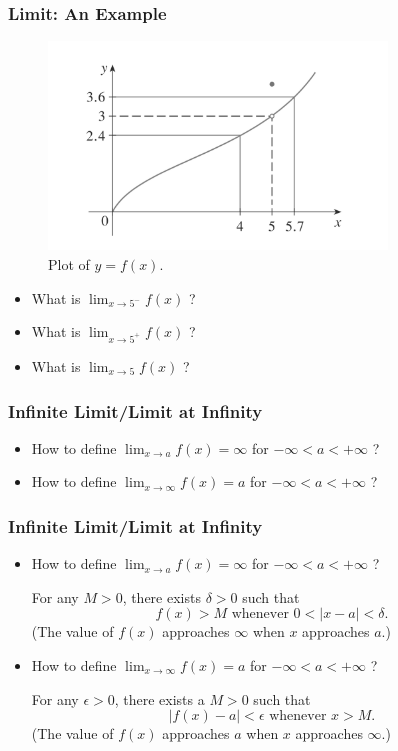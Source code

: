 \documentclass{beamer}
\begin{document}

\begin{frame}
\frametitle{Limit: An Example}
\begin{figure}[H]
\centering
\includegraphics[width=9cm]{Function-limit-eg.png}
\caption{Plot of $y=f(x)$.}
\end{figure}
\begin{itemize}
\item What is $\lim_{x\rightarrow 5^{-}}f(x)$ ?
\item What is $\lim_{x\rightarrow 5^{+}}f(x)$ ?
\item What is $\lim_{x\rightarrow 5}f(x)$ ?
\end{itemize}
\end{frame}

\begin{frame}
\frametitle{Infinite Limit/Limit at Infinity}
\begin{itemize}
\item How to define $\lim_{x \rightarrow a}f(x) = \infty$ for $-\infty < a < +\infty$ ?
\vspace*{1.5in}
\item How to define $\lim_{x \rightarrow \infty}f(x) = a$ for $-\infty < a < +\infty$ ?
\vspace*{1.5in}
\end{itemize}
\end{frame}

\begin{frame}
\frametitle{Infinite Limit/Limit at Infinity}
\begin{itemize}
\item How to define $\lim_{x \rightarrow a}f(x) = \infty$ for $-\infty < a < +\infty$ ?

\vspace*{0.1in}
For any $M > 0$, there exists $\delta > 0$ such that
$$
f(x) > M \text{ whenever } 
0 < \vert x-a \vert < \delta.
$$
(The value of $f(x)$ approaches $\infty$ when $x$ approaches $a$.)
\vspace*{0.2in}
\item How to define $\lim_{x \rightarrow \infty}f(x) = a$ for $-\infty < a < +\infty$ ?

\vspace*{0.1in}
For any $\epsilon > 0$, there exists a $M > 0$ such that
$$
\vert f(x)-a \vert < \epsilon \text{ whenever } 
x > M.
$$
(The value of $f(x)$ approaches $a$ when $x$ approaches $\infty$.)
\vspace*{0.2in}
\end{itemize}
\end{frame}
\end{document}
